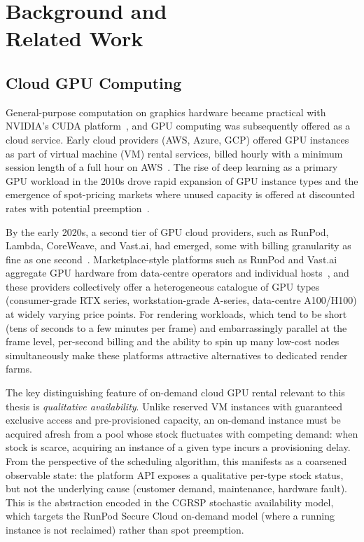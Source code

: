 \chapter[Background and Related Work]{\texorpdfstring{Background and\\Related Work}{Background and Related Work}}
\label{chap:related}

\section{Cloud GPU Computing}
\label{sec:cloud-gpu-computing}

General-purpose computation on graphics hardware became practical with NVIDIA's CUDA platform~\cite{nickolls2008scalable}, and GPU computing was subsequently offered as a cloud service. Early cloud providers (AWS, Azure, GCP) offered GPU instances as part of virtual machine (VM) rental services, billed hourly with a minimum session length of a full hour on AWS~\cite{barr2017persecond}. The rise of deep learning as a primary GPU workload in the 2010s drove rapid expansion of GPU instance types and the emergence of spot-pricing markets where unused capacity is offered at discounted rates with potential preemption~\cite{yi2010reducing,subramanya2015spoton,zheng2015bid}.

By the early 2020s, a second tier of GPU cloud providers, such as RunPod, Lambda, CoreWeave, and Vast.ai, had emerged, some with billing granularity as fine as one second~\cite{runpod2026podspricing,vastai2026concepts}. Marketplace-style platforms such as RunPod and Vast.ai aggregate GPU hardware from data-centre operators and individual hosts~\cite{runpod2026podsoverview,vastai2026concepts}, and these providers collectively offer a heterogeneous catalogue of GPU types~\cite{runpod2026podspricing,coreweave2026pricing,lambda2026pricing} (consumer-grade RTX series, workstation-grade A-series, data-centre A100/H100) at widely varying price points. For rendering workloads, which tend to be short (tens of seconds to a few minutes per frame) and embarrassingly parallel at the frame level, per-second billing and the ability to spin up many low-cost nodes simultaneously make these platforms attractive alternatives to dedicated render farms.

The key distinguishing feature of on-demand cloud GPU rental relevant to this thesis is \emph{qualitative availability}. Unlike reserved VM instances with guaranteed exclusive access and pre-provisioned capacity, an on-demand instance must be acquired afresh from a pool whose stock fluctuates with competing demand: when stock is scarce, acquiring an instance of a given type incurs a provisioning delay. From the perspective of the scheduling algorithm, this manifests as a coarsened observable state: the platform API exposes a qualitative per-type stock status, but not the underlying cause (customer demand, maintenance, hardware fault). This is the abstraction encoded in the CGRSP stochastic availability model, which targets the RunPod Secure Cloud on-demand model (where a running instance is not reclaimed) rather than spot preemption.

